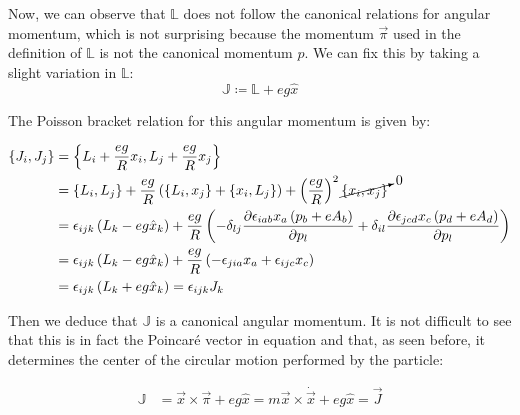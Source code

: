 Now, we can observe that $\mathbb{L}$ does not follow the canonical relations for angular momentum, which is not surprising because the momentum $\vec{\pi}$ used in the definition of $\mathbb{L}$ is not the canonical momentum $p$. We can fix this by taking a slight variation in $\mathbb{L}$:\\

\begin{equation}
\mathbb{J} \coloneqq \mathbb{L} + eg\hat{x}
\label{eq:ham poincarevec}
\end{equation}

The Poisson bracket relation for this angular momentum is given by:

\begin{align*}
\left\lbrace J_i, J_j \right\rbrace &= \left\lbrace L_i + \frac{eg}{R}x_i, L_j + \frac{eg}{R}x_j \right\rbrace\\
&= \left\lbrace L_i, L_j \right\rbrace + \frac{eg}{R}\left( \left\lbrace L_i, x_j \right\rbrace +\left\lbrace x_i, L_j \right\rbrace \right) + \left( \frac{eg}{R} \right)^2\cancelto{0}{\left\lbrace x_i, x_j \right\rbrace}\\
& = \epsilon_{ijk}\left( L_k-{eg}\hat{x}_k \right)+\frac{eg}{R}\left( -\delta_{lj}\frac{\partial \epsilon_{iab}x_a\left( p_b+eA_b \right)}{\partial p_l}+ \delta_{il}\frac{\partial\epsilon_{jcd}x_c\left( p_d+eA_d \right)}{\partial p_l} \right)\\
& = \epsilon_{ijk}\left( L_k-{eg}\hat{x}_k \right)+ \frac{eg}{R}\left( -\epsilon_{jia}x_a+\epsilon_{ijc}x_c \right)\\
&= \epsilon_{ijk}\left( L_k+{eg}\hat{x}_k \right) = \epsilon_{ijk}J_k
\end{align*}

Then we deduce that $\mathbb{J}$ is a canonical angular momentum. It is not difficult to see that this is in fact the Poincar\'e vector in equation  and that, as seen before, it determines the center of the circular motion performed by the particle:

\begin{align*}
\mathbb{J} &= \vec{x}\times\vec{\pi}+{eg}\hat{x} = m{\vec{x}}\times\dot{\vec{x}} + eg\hat{x} = \vec{J}\\ 
\end{align*}



